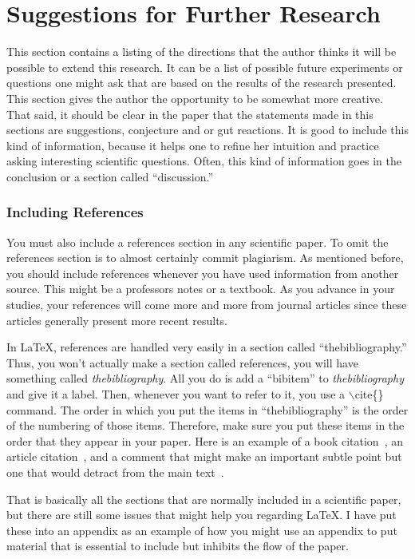 \documentclass[preprint,pre,floats,aps,amsmath,amssymb]{revtex4}
\begin{document}
\section{Suggestions for Further Research}
\label{sec:further_research}

This section contains a listing of the directions that the author thinks it will be possible to extend this research. It can be a list of possible future experiments or questions one might ask that are based on the results of the research presented. This section gives the author the opportunity to be somewhat more creative. That said, it should be clear in the paper that the statements made in this sections are suggestions, conjecture and or gut reactions. It is good to include this kind of information, because it helps one to refine her intuition and practice asking interesting scientific questions. Often, this kind of information goes in the conclusion or a section called ``discussion.''

\subsubsection*{Including References}

You must also include a references section in any scientific paper. To omit the references section is to almost certainly commit plagiarism. As mentioned before, you should include references whenever you have used information from another source. This might be a professors notes or a textbook. As you advance in your studies, your references will come more and more from journal articles since these articles generally present more recent results.

In \LaTeX, references are handled very easily in a section called ``thebibliography.'' Thus, you won't actually make a section called references, you will have something called \textit{thebibliography}. All you do is add a ``bibitem'' to \textit{thebibliography} and give it a label. Then, whenever you want to refer to it, you use a $\backslash$cite\{\} command. The order in which you put the items in ``thebibliography'' is the order of the numbering of those items. Therefore, make sure you put these items in the order that they appear in your paper. Here is an example of a book citation~\cite{FHD}, an article citation~\cite{Jackson}, and a comment that might make an important subtle point but one that would detract from the main text~\cite{Comment}.

That is basically all the sections that are normally included in a scientific paper, but there are still some issues that might help you regarding \LaTeX. I have put these into an appendix as an example of how you might use an appendix to put material that is essential to include but inhibits the flow of the paper.
\end{document}
